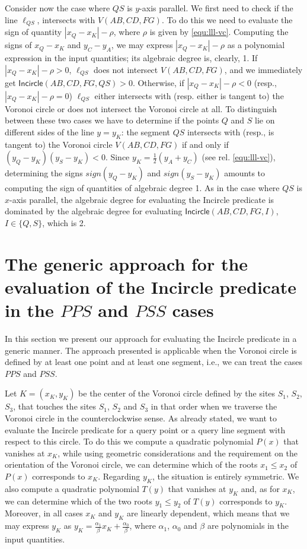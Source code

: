 \documentclass[letterpaper,11pt]{article}
\newcommand{\incircle}{\textsf{Incircle}\xspace}
\newcommand{\vor}{Voronoi\xspace}
\newcommand{\pps}{$PPS$\xspace}
\newcommand{\pss}{$PSS$\xspace}
\begin{document}
Consider now the case where $QS$ is $y$-axis parallel. We first need
to check if the line $\ell_{QS}$, intersects with $V(AB,CD,FG)$. To do
this we need to evaluate the sign of quantity $|x_Q-x_K|-\rho$, where
$\rho$ is given by \eqref{equ:lll-vc}. Computing the signs of
$x_Q-x_K$ and $y_C-y_A$, we may express $|x_Q-x_K|-\rho$ as a
polynomial expression in the input quantities; its algebraic degree is,
clearly, 1. If $|x_Q-x_K|-\rho>0$, $\ell_{QS}$ does not intersect
$V(AB,CD,FG)$, and we immediately get $\incircle(AB,CD,FG,QS)>0$.
Otherwise, if $|x_Q-x_K|-\rho<0$ (resp., $|x_Q-x_K|-\rho=0$)
$\ell_{QS}$ either intersects with (resp. either is tangent to) the
\vor circle or does not intersect the \vor circle at all. To
distinguish between these two cases we have to determine if the points
$Q$ and $S$ lie on different sides of the line $y=y_K$: the segment
$QS$ intersects with (resp., is tangent to) the \vor circle
$V(AB,CD,FG)$ if and only if $(y_Q-y_K)(y_S-y_K)<0$. Since
$y_K=\frac{1}{2}(y_A+y_C)$ (see rel. \eqref{equ:lll-vc}), determining
the signs $sign(y_Q-y_K)$ and $sign(y_S-y_K)$ amounts to computing the
sign of quantities of algebraic degree 1. As in the case where $QS$ is
$x$-axis parallel, the algebraic degree for evaluating the \incircle
predicate is dominated by the algebraic degree for evaluating
$\incircle(AB,CD,FG,I)$, $I\in\{Q,S\}$, which is 2.




\section{The generic approach for the evaluation of the \incircle
  predicate in the \pps and \pss cases}\label{sec:generic}

In this section we present our approach for evaluating the
\incircle predicate in a generic manner. The approach presented is
applicable when the \vor circle is defined by at least one point and
at least one segment, i.e., we can treat the cases \pps and \pss.

Let $K=(x_K,y_K)$ be the center of the Voronoi circle defined by the sites
$S_1$, $S_2$, $S_3$, that touches the sites $S_1$, $S_2$ and $S_3$ in
that order when we traverse the \vor circle in the counterclockwise
sense.
As already stated, we want to evaluate the \incircle predicate for a
query point or a query line segment with respect to this circle.
To do this we compute a quadratic polynomial $P(x)$ that 
vanishes at $x_K$, while using geometric considerations and the
requirement on the orientation of the \vor circle, we can determine
which of the roots $x_1\leq{}x_2$ of $P(x)$ corresponds to $x_K$. 
Regarding $y_K$, the situation is entirely symmetric. We also
compute a quadratic polynomial $T(y)$ that vanishes at $y_K$ and, as
for $x_K$, we can determine which of the two roots $y_1\leq{}y_2$ of
$T(y)$ corresponds to $y_K$. Moreover, in all cases $x_K$ and $y_K$
are linearly dependent, which means that we may express $y_K$ as
$y_K=\frac{\alpha_1}{\beta}x_K+\frac{\alpha_0}{\beta}$, where $\alpha_1$,
$\alpha_0$ and $\beta$ are polynomials in the input quantities.
\end{document}
